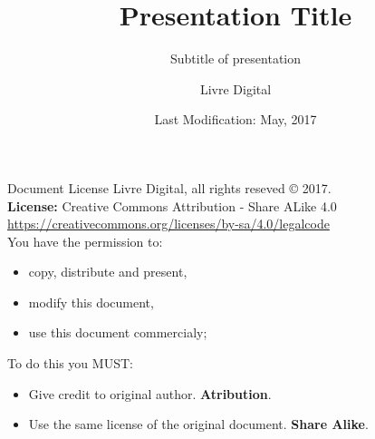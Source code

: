 \documentclass{beamer}
\title{Presentation Title}
\subtitle{Subtitle of presentation}
\author{Livre Digital}
\institute
{
  On the web: \url{http://www.livredigital.com}\\
  Socials: \href{https://www.twitter.com/LivreDigitalCom}{@LivreDigitalCom} | \href{https://www.github.com/livredigital}{Github} | \href{https://www.linkedin.com/company/livredigital}{LinkedIn}
}
\date{Last Modification: May, 2017}
\begin{document}
\begin{frame}
  \titlepage
\end{frame}

\begin{frame}{Document License}
  Livre Digital, all rights reseved \copyright{} 2017.\\
  \textbf{License:} Creative Commons Attribution - Share ALike 4.0\\
  \small{\url{https://creativecommons.org/licenses/by-sa/4.0/legalcode}}\\[1cm]
  You have the permission to:
  \begin{itemize}
      \item copy, distribute and present,
      \item modify this document,
      \item use this document commercialy;
  \end{itemize}
  To do this you MUST:
  \begin{itemize}
      \item Give credit to original author. \textbf{Atribution}.
      \item Use the same license of the original document. \textbf{Share Alike}.
  \end{itemize}
\end{frame}
\end{document}
